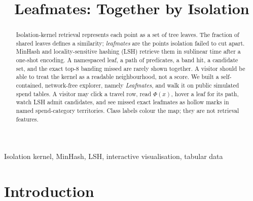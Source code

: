 \documentclass[conference]{IEEEtran}
\newcommand{\sys}{\emph{Leafmates}}
\begin{document}
\title{Leafmates: Together by Isolation}

\author{
\and
{}
\and
{}
}

\maketitle

\begin{abstract}
Isolation-kernel retrieval represents each point as a set of tree leaves. The fraction of shared leaves defines a similarity; \emph{leafmates} are the points isolation failed to cut apart. MinHash and locality-sensitive hashing (LSH) retrieve them in sublinear time after a one-shot encoding. A namespaced leaf, a path of predicates, a band hit, a candidate set, and the exact top-$8$ banding missed are rarely shown together. A visitor should be able to treat the kernel as a readable neighbourhood, not a score. We built a self-contained, network-free explorer, namely \sys{}, and walk it on public simulated spend tables. A visitor may click a travel row, read $\Phi(x)$, hover a leaf for its path, watch LSH admit candidates, and see missed exact leafmates as hollow marks in named spend-category territories. Class labels colour the map; they are not retrieval features.
\end{abstract}

\begin{IEEEkeywords}
Isolation kernel, MinHash, LSH, interactive visualisation, tabular data
\end{IEEEkeywords}

\section{Introduction}
\end{document}
